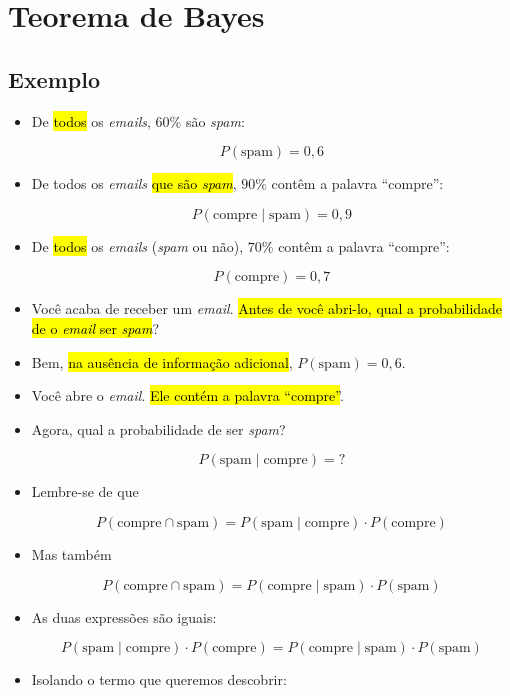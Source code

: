 \documentclass[
  11pt]{report}
\begin{document}
\hypertarget{teorema-de-bayes}{%
\section{Teorema de Bayes}\label{teorema-de-bayes}}

\hypertarget{exemplo-4}{%
\subsection{Exemplo}\label{exemplo-4}}

\begin{itemize}
\item
  De {\hl{todos}} os \emph{emails}, $60\%$ são \emph{spam}:

  \[
  P(\text{spam}) = 0{,}6
  \]
\item
  De todos os \emph{emails} {\hl{que são \emph{spam}}}, $90\%$ contêm a palavra ``compre'':

  \[
  P(\text{compre} \mid \text{spam}) = 0{,}9
  \]
\item
  De {\hl{todos}} os \emph{emails} (\emph{spam} ou não), $70\%$ contêm a palavra ``compre'':

  \[
  P(\text{compre}) = 0{,}7
  \]
\item
  Você acaba de receber um \emph{email}. {\hl{Antes de você abri-lo, qual a probabilidade de o \emph{email} ser \emph{spam}}}?
\item
  Bem, {\hl{na ausência de informação adicional}}, $P(\text{spam}) = 0{,}6$.
\item
  Você abre o \emph{email}. {\hl{Ele contém a palavra ``compre''}}.
\item
  Agora, qual a probabilidade de ser \emph{spam}?

  \[
  P(\text{spam} \mid \text{compre}) = {}?
  \]
\item
  Lembre-se de que

  \[
  P(\text{compre} \cap \text{spam}) = P(\text{spam} \mid \text{compre}) \cdot P(\text{compre})
  \]
\item
  Mas também

  \[
  P(\text{compre} \cap \text{spam}) = P(\text{compre} \mid \text{spam}) \cdot P(\text{spam})
  \]
\item
  As duas expressões são iguais:

  \[
  P(\text{spam} \mid \text{compre}) \cdot P(\text{compre}) = P(\text{compre} \mid \text{spam}) \cdot P(\text{spam})
  \]
\item
  Isolando o termo que queremos descobrir:


\end{itemize}
\end{document}

